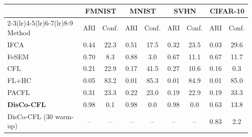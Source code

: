 \begin{tabular}{lcccccccc}
\toprule
 & \multicolumn{2}{c}{FMNIST} & \multicolumn{2}{c}{MNIST} & \multicolumn{2}{c}{SVHN} & \multicolumn{2}{c}{CIFAR-10} \\
\cmidrule(lr){2-3}\cmidrule(lr){4-5}\cmidrule(lr){6-7}\cmidrule(lr){8-9}
Method & ARI & Conf. & ARI & Conf. & ARI & Conf. & ARI & Conf. \\
\midrule
IFCA & 0.44 & 22.3 & 0.51 & 17.5 & 0.32 & 23.5 & 0.03 & 29.6 \\
FeSEM & 0.70 & 8.3 & 0.88 & 3.0 & 0.67 & 11.1 & 0.67 & 11.7 \\
CFL & 0.21 & 22.9 & 0.17 & 41.5 & 0.27 & 10.6 & 0.16 & 0.3 \\
FL+HC & 0.05 & 83.2 & 0.01 & 85.3 & 0.01 & 84.9 & 0.01 & 85.0 \\
PACFL & 0.31 & 23.3 & 0.22 & 23.0 & 0.19 & 22.9 & 0.19 & 33.3 \\
\textbf{DisCo-CFL} & 0.98 & 0.1 & 0.98 & 0.0 & 0.98 & 0.0 & 0.63 & 13.8 \\
DisCo-CFL (30 warm-up) & -- & -- & -- & -- & -- & -- & 0.83 & 2.2 \\
\bottomrule
\end{tabular}
